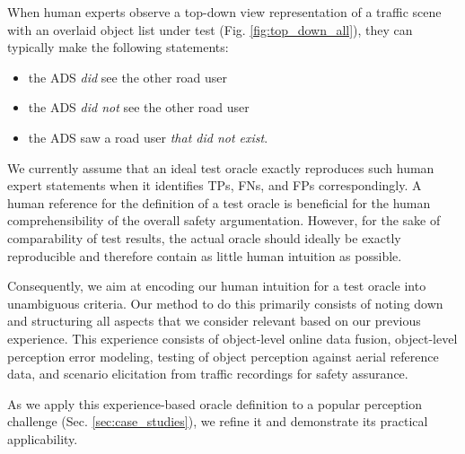 \documentclass[conference]{IEEEtran}
\begin{document}

When human experts observe a top-down view representation of a traffic scene with an overlaid object list under test (Fig. \ref{fig:top_down_all}), they can typically make the following statements:
\begin{itemize}
	\item the ADS \textit{did} see the other road user
	\item the ADS \textit{did not} see the other road user 
	\item the ADS saw a road user \textit{that did not exist}.
\end{itemize}

We currently assume that an ideal test oracle exactly reproduces such human expert statements when it identifies TPs, FNs, and FPs correspondingly.
A human reference for the definition of a test oracle is beneficial for the human comprehensibility of the overall safety argumentation. 
However, for the sake of comparability of test results, the actual oracle should ideally be exactly reproducible and therefore contain as little human intuition as possible. 

Consequently, we aim at encoding our human intuition for a test oracle into unambiguous criteria. 
Our method to do this primarily consists of noting down and structuring all aspects that we consider relevant based on our previous experience. 
This experience consists of object-level online data fusion, object-level perception error modeling, testing of object perception against aerial reference data, and scenario elicitation from traffic recordings for safety assurance. 


As we apply this experience-based oracle definition to a popular perception challenge (Sec. \ref{sec:case_studies}), we refine it and demonstrate its practical applicability. 






\end{document}
